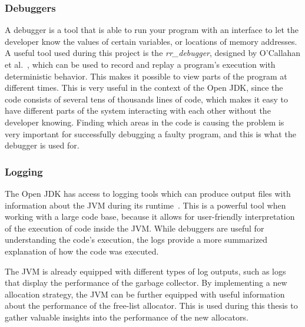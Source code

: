 \subsubsection{Debuggers}
A debugger is a tool that is able to run your program with an interface to let the developer know the values of certain variables, or locations of memory addresses. A useful tool used during this project is the \textit{rr\_debugger}, designed by O'Callahan et al.~\cite{rrdebugger}, which can be used to record and replay a program's execution with deterministic behavior. This makes it possible to view parts of the program at different times. This is very useful in the context of the Open JDK, since the code consists of several tens of thousands lines of code, which makes it easy to have different parts of the system interacting with each other without the developer knowing. Finding which areas in the code is causing the problem is very important for successfully debugging a faulty program, and this is what the debugger is used for.

\subsubsection{Logging}
The Open JDK has access to logging tools which can produce output files with information about the JVM during its runtime~\cite{java:logs}. This is a powerful tool when working with a large code base, because it allows for user-friendly interpretation of the execution of code inside the JVM. While debuggers are useful for understanding the code's execution, the logs provide a more summarized explanation of how the code was executed. 

The JVM is already equipped with different types of log outputs, such as logs that display the performance of the garbage collector. By implementing a new allocation strategy, the JVM can be further equipped with useful information about the performance of the free-list allocator. This is used during this thesis to gather valuable insights into the performance of the new allocators.
